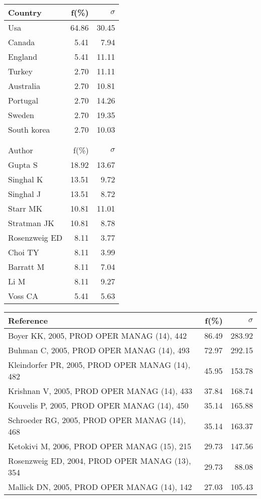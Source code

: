 \documentclass[a4paper,11pt]{report}
\begin{document}
\begin{landscape}
\begin{table}[!ht]
{\begin{tabular}{|l r r|}
\hline
\hline
Country & f(\%) & $\sigma$\\
\hline
Usa & 64.86 & 30.45\\
Canada & 5.41 & 7.94\\
England & 5.41 & 11.11\\
Turkey & 2.70 & 11.11\\
Australia & 2.70 & 10.81\\
Portugal & 2.70 & 14.26\\
Sweden & 2.70 & 19.35\\
South korea & 2.70 & 10.03\\
 &  & \\
 &  & \\
\hline
\hline
Author & f(\%) & $\sigma$\\
\hline
Gupta S & 18.92 & 13.67\\
Singhal K & 13.51 & 9.72\\
Singhal J & 13.51 & 8.72\\
Starr MK & 10.81 & 11.01\\
Stratman JK & 10.81 & 8.78\\
Rosenzweig ED & 8.11 & 3.77\\
Choi TY & 8.11 & 3.99\\
Barratt M & 8.11 & 7.04\\
Li M & 8.11 & 9.27\\
Voss CA & 5.41 & 5.63\\
\hline
\end{tabular}
}
{\scriptsize\begin{tabular}{|l r r|}
\hline
Reference & f(\%) & $\sigma$\\
\hline
Boyer KK, 2005, PROD OPER MANAG (14), 442 & 86.49 & 283.92\\
Buhman C, 2005, PROD OPER MANAG (14), 493 & 72.97 & 292.15\\
Kleindorfer PR, 2005, PROD OPER MANAG (14), 482 & 45.95 & 153.78\\
Krishnan V, 2005, PROD OPER MANAG (14), 433 & 37.84 & 168.74\\
Kouvelis P, 2005, PROD OPER MANAG (14), 450 & 35.14 & 165.88\\
Schroeder RG, 2005, PROD OPER MANAG (14), 468 & 35.14 & 163.37\\
Ketokivi M, 2006, PROD OPER MANAG (15), 215 & 29.73 & 147.56\\
Rosenzweig ED, 2004, PROD OPER MANAG (13), 354 & 29.73 & 88.08\\
Mallick DN, 2005, PROD OPER MANAG (14), 142 & 27.03 & 105.43\\

\end{tabular}}
\end{table}
\end{landscape}
\end{document}
